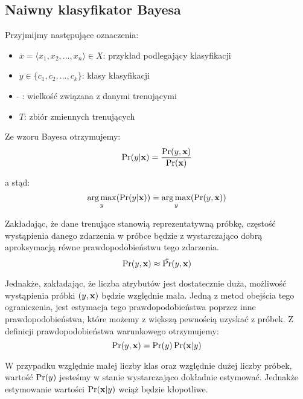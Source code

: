 \documentclass[16]{article}
\begin{document}
\subsection{Naiwny klasyfikator Bayesa}
Przyjmijmy następujące oznaczenia:
\begin{itemize}[label=]
    \item $x = \langle x_{1}, x_{2}, ..., x_{n} \rangle \in X$: przykład podlegający klasyfikacji
    \item $y \in \{c_{1}, c_{2}, ..., c_{k} \}  $: klasy klasyfikacji
    \item $\hat{ }$  : wielkość związana z danymi trenującymi
    \item $T$: zbiór zmiennych trenujących
\end{itemize} 

Ze wzoru Bayesa otrzymujemy:
\begin{equation}
 \Pr(\mathnormal{y}|\bf{x})=\frac{\Pr(\mathnormal{y}, \bf{x})}{\Pr(\bf{x})}
\end{equation} 

a stąd:
\begin{equation}
 \operatorname*{arg\,max}_\mathnormal{y} (\Pr(\mathnormal{y}|\bf{x})) = \operatorname*{arg\,max}_\mathnormal{y} (\Pr(\mathnormal{y}, \bf{x}))
\end{equation} 

Zakładając, że dane trenujące stanowią reprezentatywną próbkę, częstość wystąpienia danego zdarzenia w próbce będzie z wystarczająco dobrą aproksymacją równe prawdopodobieństwu tego zdarzenia. 
\begin{equation}
\Pr(\mathnormal{y}, \bf{x}) \approx \hat{\Pr}(\mathnormal{y}, \bf{x})
\end{equation} 

Jednakże, zakładając, że liczba atrybutów jest dostatecznie duża, możliwość wystąpienia próbki $(\mathnormal{y}, \bf{x})$ będzie względnie mała. Jedną z metod obejścia tego ograniczenia, jest estymacja tego prawdopodobieństwa poprzez inne prawdopodobieństwa, które możemy z większą pewnością uzyskać z próbek.
Z definicji prawdopodobieństwa warunkowego otrzymujemy:
\begin{equation}
\Pr(\mathnormal{y}, \bf{x}) = \Pr(\mathnormal{y})\Pr(\bf{x}|\mathnormal{y})
\end{equation} 

W przypadku względnie małej liczby klas oraz względnie dużej liczby próbek, wartość $\Pr(\mathnormal{y})$ jesteśmy w stanie wystarczająco dokładnie estymować. Jednakże estymowanie wartości $\Pr(\bf{x}|\mathnormal{y})$ wciąż będzie kłopotliwe. \\
\end{document}
